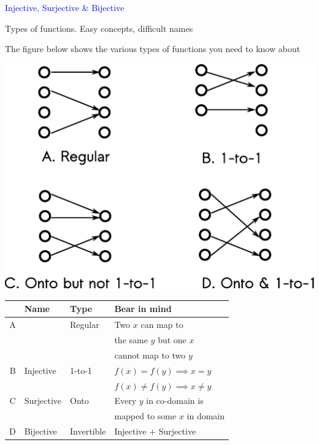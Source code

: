\documentclass[14pt,fleqn]{extarticle}
\begin{document}
 
\begin{skill}
    \begin{narrow}
         \textcolor{blue}{Injective, Surjective \& Bijective} 
         
         Types of functions. Easy concepts, difficult names
    \end{narrow}
    
    \reason 
    
    The figure below shows the various types of functions you need 
    to know about 
    
    \begin{center}
\includegraphics[scale=0.33]{142-A.eps}
\end{center}
    
    \begin{center}
  \begin{tabular}{Nlll}
   \toprule
        & Name & Type & Bear in mind \\
   \midrule 
   A & & Regular & Two $x$ can map to\\
   & & & the same $y$ but one $x$\\
   & & & cannot map to two $y$ \\
    \midrule
  B & Injective & 1-to-1 & $f(x) = f(y) \implies x = y$ \\
  & & & $f(x)\neq f(y)\implies x \neq y$ \\
  \midrule 
  C & Surjective & Onto & Every $y$ in co-domain is\\
  & & & mapped to some $x$ in domain  \\
  \midrule 
  D & Bijective & Invertible & Injective $+$ Surjective\\  
    \bottomrule
  \end{tabular}
\end{center}
\end{skill}
\end{document}
